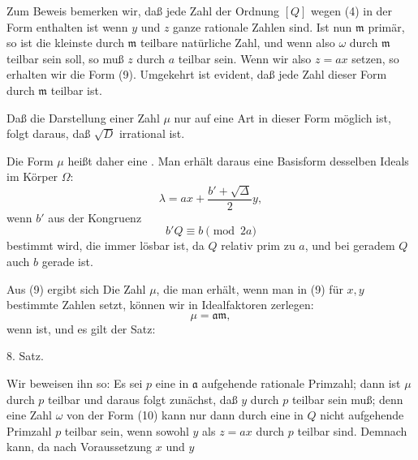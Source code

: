 

Zum Beweis bemerken wir, daß jede Zahl der Ordnung $[Q]$ wegen (4) in der Form enthalten ist
wenn $y$ und $z$ ganze rationale Zahlen sind. Ist nun $\mathfrak{m}$ primär, so ist
die kleinste durch $\mathfrak{m}$ teilbare natürliche Zahl, und wenn also $\omega$ durch $\mathfrak{m}$ teilbar sein soll, so muß $z$ durch $a$ teilbar sein. Wenn wir also $z = ax$ setzen, so erhalten wir die Form (9). Umgekehrt ist evident, daß jede Zahl dieser Form durch $\mathfrak{m}$ teilbar ist.

Daß die Darstellung einer Zahl $\mu$ nur auf eine Art in dieser Form möglich ist, folgt daraus, daß $\sqrt{D}$ irrational ist.

Die Form $\mu$ heißt daher eine . Man erhält daraus eine Basisform desselben Ideals im Körper $\Omega$:
\[ \lambda = ax + \frac{b' + \sqrt{\Delta}}{2} y, \]
wenn $b'$ aus der Kongruenz
\[ b'Q \equiv b \pmod{2a} \]
bestimmt wird, die immer lösbar ist, da $Q$ relativ prim zu $a$, und bei geradem $Q$ auch $b$ gerade ist.

Aus (9) ergibt sich
Die Zahl $\mu$, die man erhält, wenn man in (9) für $x, y$ bestimmte Zahlen setzt, können wir in Idealfaktoren zerlegen:
\[ \mu = \mathfrak{a}\mathfrak{m}, \]
wenn
ist, und es gilt der Satz:

8. Satz. 

Wir beweisen ihn so: Es sei $p$ eine in $\mathfrak{a}$ aufgehende rationale Primzahl; dann ist $\mu$ durch $p$ teilbar und daraus folgt zunächst, daß $y$ durch $p$ teilbar sein muß; denn eine Zahl $\omega$ von der Form (10) kann nur dann durch eine in $Q$ nicht aufgehende Primzahl $p$ teilbar sein, wenn sowohl $y$ als $z = ax$ durch $p$ teilbar sind. Demnach kann, da nach Voraussetzung $x$ und $y$
